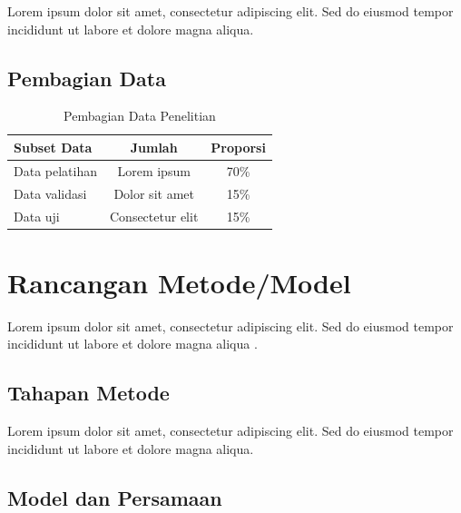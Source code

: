 
Lorem ipsum dolor sit amet, consectetur adipiscing elit. Sed do eiusmod tempor incididunt ut labore et dolore magna aliqua.

\subsection{Pembagian Data}


\begin{table}[H]
\centering
\caption{Pembagian Data Penelitian}
\begin{tabular}{|l|c|c|}
\hline
\textbf{Subset Data} & \textbf{Jumlah} & \textbf{Proporsi} \\
\hline
Data pelatihan & Lorem ipsum & 70\% \\
Data validasi & Dolor sit amet & 15\% \\
Data uji & Consectetur elit & 15\% \\
\hline
\end{tabular}
\label{tab:pembagian-data}
\end{table}

\section{Rancangan Metode/Model}


Lorem ipsum dolor sit amet, consectetur adipiscing elit. Sed do eiusmod tempor incididunt ut labore et dolore magna aliqua \citep{referensi1}.

\subsection{Tahapan Metode}


Lorem ipsum dolor sit amet, consectetur adipiscing elit. Sed do eiusmod tempor incididunt ut labore et dolore magna aliqua.

\subsection{Model dan Persamaan}

